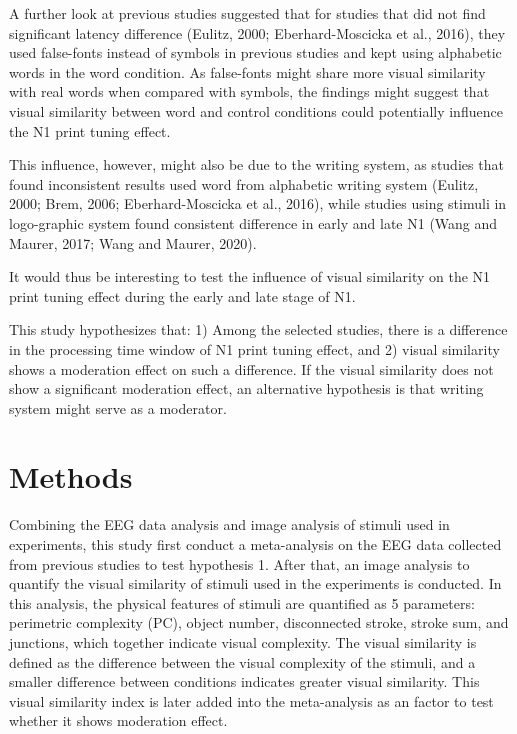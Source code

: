 \documentclass{article}
\begin{document}
A further look at previous studies suggested that for studies that did not find significant latency difference (Eulitz, 2000; Eberhard-Moscicka et al., 2016),  they used false-fonts instead of symbols in previous studies and kept using alphabetic words in the word condition. As false-fonts might share more visual similarity with real words when compared with symbols, the findings might suggest that visual similarity between word and control conditions could potentially influence the N1 print tuning effect.

This influence, however, might also be due to the writing system, as studies that found inconsistent results used word from alphabetic writing system (Eulitz, 2000; Brem, 2006; Eberhard-Moscicka et al., 2016), while studies using stimuli in logo-graphic system found consistent difference in early and late N1 (Wang and Maurer, 2017; Wang and Maurer, 2020).

It would thus be interesting to test the influence of visual similarity on the N1 print tuning effect during the early and late stage of N1. %

This study hypothesizes that: 1) Among the selected studies, there is a difference in the processing time window of N1 print tuning effect, and 2) visual similarity shows a moderation effect on such a difference. If the visual similarity does not show a significant moderation effect, an alternative hypothesis is that writing system might serve as a moderator.
\section{Methods}

Combining the EEG data analysis and image analysis of stimuli used in experiments, this study first conduct a meta-analysis on the EEG data collected from previous studies to test hypothesis 1. After that, an image analysis to quantify the visual similarity of stimuli used in the experiments is conducted. In this analysis, the physical features of stimuli are quantified as 5 parameters: perimetric complexity (PC), object number, disconnected stroke, stroke sum, and junctions, which together indicate visual complexity. The visual similarity is defined as the difference between the visual complexity of the stimuli, and a smaller difference between conditions indicates greater visual similarity. This visual similarity index is later added into the meta-analysis as an factor to test whether it shows moderation effect.
\end{document}
